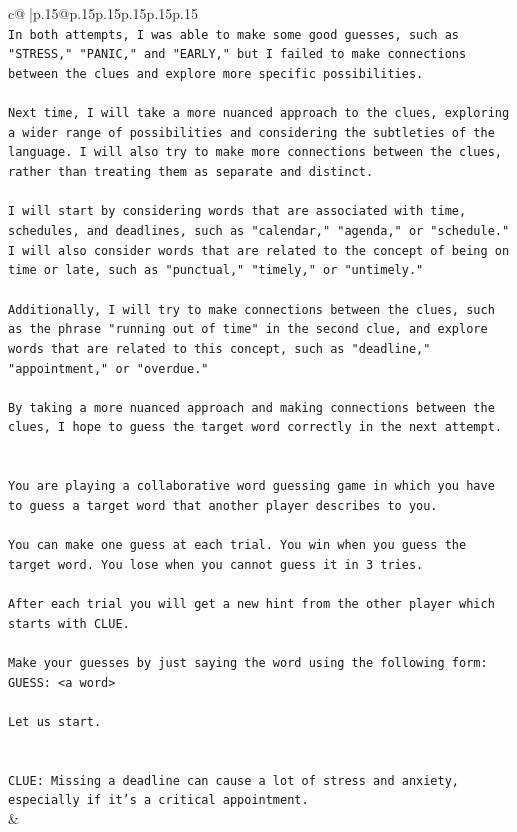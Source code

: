 \documentclass{article}
\begin{document}
{\begin{supertabular}{c@{$\;$}|p{.15\linewidth}@{}p{.15\linewidth}p{.15\linewidth}p{.15\linewidth}p{.15\linewidth}p{.15\linewidth}}
{{{\\ 
\texttt{In both attempts, I was able to make some good guesses, such as "STRESS," "PANIC," and "EARLY," but I failed to make connections between the clues and explore more specific possibilities. } \\
\\ 
\texttt{Next time, I will take a more nuanced approach to the clues, exploring a wider range of possibilities and considering the subtleties of the language. I will also try to make more connections between the clues, rather than treating them as separate and distinct. } \\
\\ 
\texttt{I will start by considering words that are associated with time, schedules, and deadlines, such as "calendar," "agenda," or "schedule." I will also consider words that are related to the concept of being on time or late, such as "punctual," "timely," or "untimely." } \\
\\ 
\texttt{Additionally, I will try to make connections between the clues, such as the phrase "running out of time" in the second clue, and explore words that are related to this concept, such as "deadline," "appointment," or "overdue." } \\
\\ 
\texttt{By taking a more nuanced approach and making connections between the clues, I hope to guess the target word correctly in the next attempt.} \\
\\ 
\\ 
\texttt{You are playing a collaborative word guessing game in which you have to guess a target word that another player describes to you.} \\
\\ 
\texttt{You can make one guess at each trial. You win when you guess the target word. You lose when you cannot guess it in 3 tries.} \\
\\ 
\texttt{After each trial you will get a new hint from the other player which starts with CLUE.} \\
\\ 
\texttt{Make your guesses by just saying the word using the following form: GUESS: <a word>} \\
\\ 
\texttt{Let us start.} \\
\\ 
\\ 
\texttt{CLUE: Missing a deadline can cause a lot of stress and anxiety, especially if it's a critical appointment.} \\
            }
        }
    }
    & \\ \\


\end{supertabular}}
\end{document}

